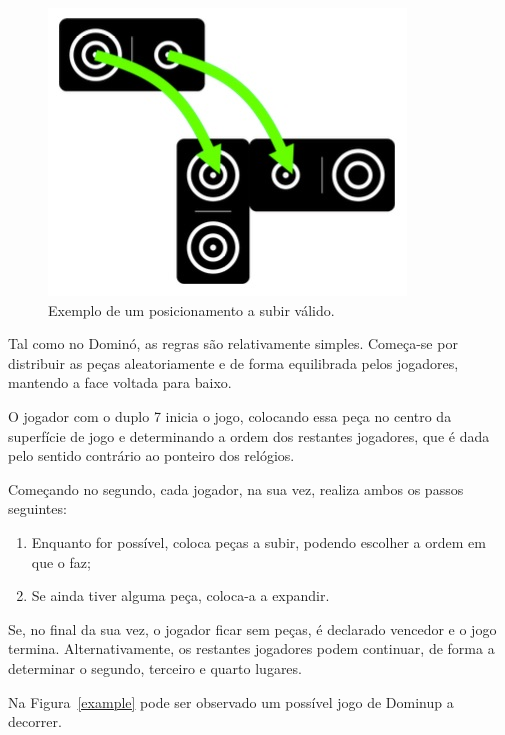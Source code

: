 \documentclass[a4paper]{article}
\begin{document}
\begin{figure}[htbp]
\begin{center}
\includegraphics[scale=0.6]{climb.jpg}
\caption{Exemplo de um posicionamento a subir válido.}
\label{climb}
\end{center}
\end{figure}

Tal como no Dominó, as regras são relativamente simples. Começa-se por distribuir as peças aleatoriamente e de forma equilibrada pelos jogadores, mantendo a face voltada para baixo. 

O jogador com o duplo 7 inicia o jogo, colocando essa peça no centro da superfície de jogo e determinando a ordem dos restantes jogadores, que é dada pelo sentido contrário ao ponteiro dos relógios. 

Começando no segundo, cada jogador, na sua vez, realiza ambos os passos seguintes:
\begin{enumerate}
	\item Enquanto for possível, coloca peças a subir, podendo escolher a ordem em que o faz;
	\item Se ainda tiver alguma peça, coloca-a a expandir.
\end{enumerate}

Se, no final da sua vez, o jogador ficar sem peças, é declarado vencedor e o jogo termina. Alternativamente, os restantes jogadores podem continuar, de forma a determinar o segundo, terceiro e quarto lugares.

Na Figura~\ref{example} pode ser observado um possível jogo de Dominup a decorrer.
\end{document}
